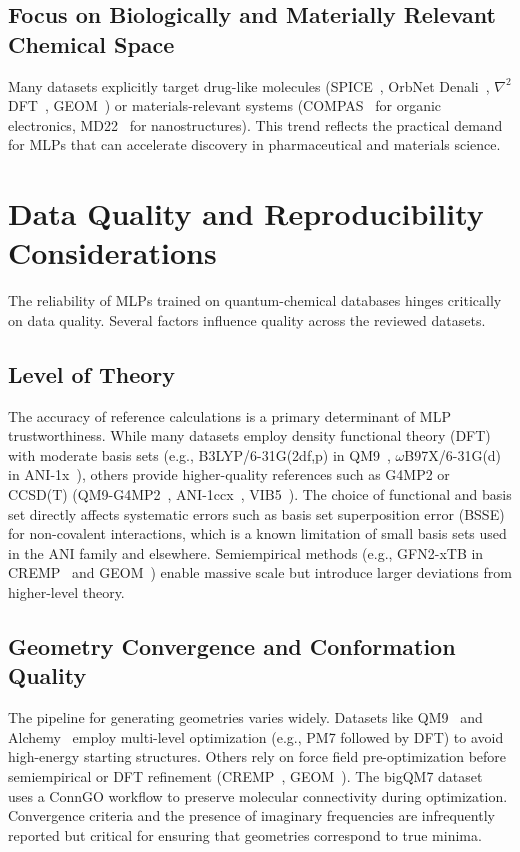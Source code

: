 \documentclass[12pt]{article}
\begin{document}
\subsection*{Focus on Biologically and Materially Relevant Chemical Space}
Many datasets explicitly target drug-like molecules (SPICE~\cite{ds12-43}, OrbNet Denali~\cite{ds19-25}, $\nabla^2$DFT~\cite{ds31-23}, GEOM~\cite{ds34-16}) or materials-relevant systems (COMPAS~\cite{ds32-12} for organic electronics, MD22~\cite{ds22-21} for nanostructures). This trend reflects the practical demand for MLPs that can accelerate discovery in pharmaceutical and materials science.

\section{Data Quality and Reproducibility Considerations}

The reliability of MLPs trained on quantum-chemical databases hinges critically on data quality. Several factors influence quality across the reviewed datasets.

\subsection*{Level of Theory}
The accuracy of reference calculations is a primary determinant of MLP trustworthiness. While many datasets employ density functional theory (DFT) with moderate basis sets (e.g., B3LYP/6-31G(2df,p) in QM9~\cite{ds1-1}, $\omega$B97X/6-31G(d) in ANI-1x~\cite{ds26-3}), others provide higher-quality references such as G4MP2 or CCSD(T) (QM9-G4MP2~\cite{ds2-36}, ANI-1ccx~\cite{ds26-3}, VIB5~\cite{ds24-48}). The choice of functional and basis set directly affects systematic errors such as basis set superposition error (BSSE) for non-covalent interactions, which is a known limitation of small basis sets used in the ANI family and elsewhere. Semiempirical methods (e.g., GFN2-xTB in CREMP~\cite{ds33-15} and GEOM~\cite{ds34-16}) enable massive scale but introduce larger deviations from higher-level theory.

\subsection*{Geometry Convergence and Conformation Quality}
The pipeline for generating geometries varies widely. Datasets like QM9~\cite{ds1-1} and Alchemy~\cite{ds10-6} employ multi-level optimization (e.g., PM7 followed by DFT) to avoid high-energy starting structures. Others rely on force field pre-optimization before semiempirical or DFT refinement (CREMP~\cite{ds33-15}, GEOM~\cite{ds34-16}). The bigQM7 dataset~\cite{ds17-9} uses a ConnGO workflow to preserve molecular connectivity during optimization. Convergence criteria and the presence of imaginary frequencies are infrequently reported but critical for ensuring that geometries correspond to true minima.
\end{document}
